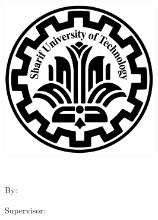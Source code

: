 
\pagestyle{empty}

\begin{center}

\begin{latin}

\includegraphics[scale=0.4]{front/template/images/logo-en.png}

\EnglishThesisUniversity \\
\EnglishThesisDepartment

\begin{large}
\vspace{0.2cm}
\EnglishThesisType


\vspace{1cm}

{\Large\textbf\EnglishThesisTitle}

\vspace{1cm}

{\normalsize By:}\\
\textbf{\EnglishThesisAuthor}

\vspace{0.8cm}

{\normalsize Supervisor:}\\ 
\textbf{\EnglishThesisSupervisor}

\end{large}

\vspace{1.5cm}
\EnglishThesisDate

\end{latin}

\end{center}
